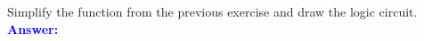 \item{}
Simplify the function from the previous exercise and draw the logic circuit.\\[12pt]
\ifanswers
\textcolor{blue}{
\textbf{Answer:}\\
}
\newpage
\fi

